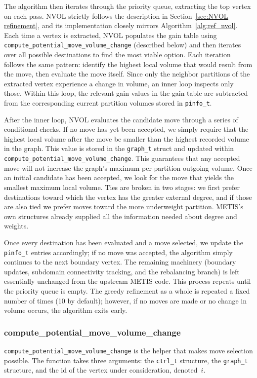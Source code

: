 The algorithm then iterates through the priority queue, extracting the top vertex on each pass. NVOL strictly follows the description in Section~\ref{sec:NVOL refinement}, and its implementation closely mirrors Algorithm~\ref{alg:ref_nvol}. Each time a vertex is extracted, NVOL populates the gain table using \texttt{compute\_potential\_move\_volume\_change} (described below) and then iterates over all possible destinations to find the most viable option. Each iteration follows the same pattern: identify the highest local volume that would result from the move, then evaluate the move itself. Since only the neighbor partitions of the extracted vertex experience a change in volume, an inner loop inspects only those. Within this loop, the relevant gain values in the gain table are subtracted from the corresponding current partition volumes stored in \texttt{pinfo\_t}.

After the inner loop, NVOL evaluates the candidate move through a series of conditional checks. If no move has yet been accepted, we simply require that the highest local volume after the move be smaller than the highest recorded volume in the graph. This value is stored in the \texttt{graph\_t} struct and updated within \texttt{compute\_potential\_move\_volume\_change}. This guarantees that any accepted move will not increase the graph's maximum per-partition outgoing volume. Once an initial candidate has been accepted, we look for the move that yields the smallest maximum local volume. Ties are broken in two stages: we first prefer destinations toward which the vertex has the greater external degree, and if those are also tied we prefer moves toward the more underweight partition. METIS's own structures already supplied all the information needed about degree and weights.

Once every destination has been evaluated and a move selected, we update the \texttt{pinfo\_t} entries accordingly; if no move was accepted, the algorithm simply continues to the next boundary vertex. The remaining machinery (boundary updates, subdomain connectivity tracking, and the rebalancing branch) is left essentially unchanged from the upstream METIS code. This process repeats until the priority queue is empty. The greedy refinement as a whole is repeated a fixed number of times (10 by default); however, if no moves are made or no change in volume occurs, the algorithm exits early.

\subsubsection{compute\_potential\_move\_volume\_change}
\texttt{compute\_potential\_move\_volume\_change} is the helper that makes move selection possible. The function takes three arguments: the \texttt{ctrl\_t} structure, the \texttt{graph\_t} structure, and the id of the vertex under consideration, denoted~$i$.


